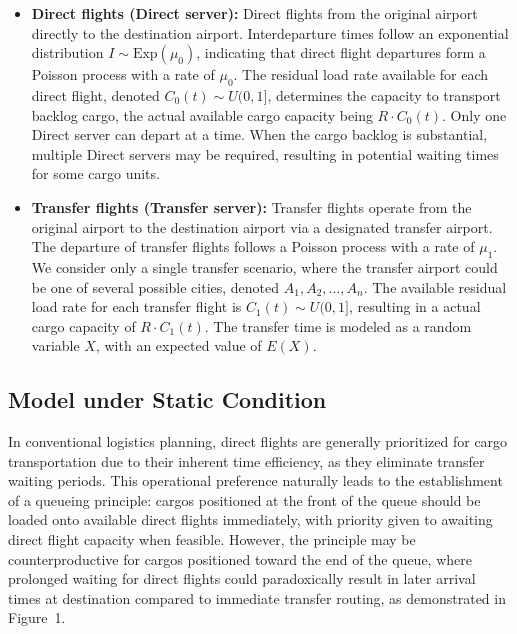 \documentclass[opre,sglanonrev]{informs4}
\begin{document}
\begin{itemize}
    \item \textbf{Direct flights (Direct server):} Direct flights from the original airport directly to the destination airport. Interdeparture times follow an exponential distribution \( I \sim \text{Exp}(\mu_0) \), indicating that direct flight departures form a Poisson process with a rate of \( \mu_0 \). The residual load rate available for each direct flight, denoted \( C_0(t) \sim U(0,1] \), determines the capacity to transport backlog cargo, the actual available cargo capacity being \( R \cdot C_0(t) \). Only one Direct server can depart at a time. When the cargo backlog is substantial, multiple Direct servers may be required, resulting in potential waiting times for some cargo units.
    
    \item \textbf{Transfer flights (Transfer server):} Transfer flights operate from the original airport to the destination airport via a designated transfer airport. The departure of transfer flights follows a Poisson process with a rate of \( \mu_1 \). We consider only a single transfer scenario, where the transfer airport could be one of several possible cities, denoted \( A_1, A_2, \ldots, A_n \). The available residual load rate for each transfer flight is \( C_1(t) \sim U(0,1] \), resulting in a actual cargo capacity of \( R \cdot C_1(t) \). The transfer time is modeled as a random variable \( X \), with an expected value of \( E(X) \).
\end{itemize}

\subsection{Model under Static Condition}
\label{sec:static_model}
In conventional logistics planning, direct flights are generally prioritized for cargo transportation due to their inherent time efficiency, as they eliminate transfer waiting periods. This operational preference naturally leads to the establishment of a queueing principle: cargos positioned at the front of the queue should be loaded onto available direct flights immediately, with priority given to awaiting direct flight capacity when feasible. However, the principle may be counterproductive for cargos positioned toward the end of the queue, where prolonged waiting for direct flights could paradoxically result in later arrival times at destination compared to immediate transfer routing, as demonstrated in Figure~1.
\end{document}
